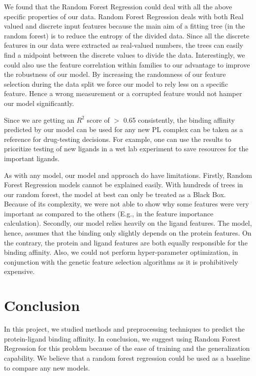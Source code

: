 \documentclass[11pt]{article}
\begin{document}
We found that the Random Forest Regression could deal with all the above specific properties of our data.
Random Forest Regression deals with both Real valued and discrete input features because the main aim of a fitting tree (in the random forest) is to reduce the entropy of the divided data.
Since all the discrete features in our data were extracted as real-valued numbers,  the trees can easily find a midpoint between the discrete values to divide the data. 
Interestingly,  we could also use the feature correlation within families to our advantage to improve the robustness of our model. 
By increasing the randomness of our feature selection during the data split we force our model to rely less on a specific feature.
Hence a wrong measurement or a corrupted feature would not hamper our model significantly.

Since we are getting an $R^2$ score of $>$ 0.65 consistently,  the binding affinity predicted by our model can be used for any new PL complex can be taken as a reference for drug-testing decisions.
For example,  one can use the results to prioritize testing of new ligands in a wet lab experiment to save resources for the important ligands.

As with any model,  our model and approach do have limitations. 
Firstly, Random Forest Regression models cannot be explained easily.
With hundreds of trees in our random forest, the model at best can only be treated as a Black Box.
Because of its complexity,  we were not able to show why some features were very important as compared to the others (E.g., in the feature importance calculation).
Secondly, our model relies heavily on the ligand features. 
The model, hence, assumes that the binding only slightly depends on the protein features. On the contrary, the protein and ligand features are both equally responsible for the binding affinity.
Also, we could not perform hyper-parameter optimization,
in conjunction with the genetic feature selection algorithms as it is prohibitively expensive.

\section{Conclusion}
In this project, we studied methods and preprocessing techniques to predict the protein-ligand binding affinity.
In conclusion, we suggest using Random Forest Regression for this problem because of the ease of training and the generalization capability.
We believe that a random forest regression could be used as a baseline to compare any new models.
\end{document}
